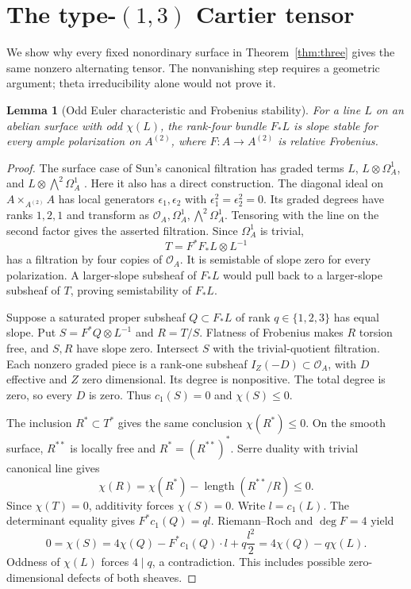\documentclass[11pt]{article}
\newtheorem{lemma}[theorem]{Lemma}
\theoremstyle{remark}\newtheorem{remark}[theorem]{Remark}
\newcommand{\OO}{\mathcal O}
\begin{document}
\section{The type-\texorpdfstring{$(1,3)$}{(1,3)} Cartier tensor}\label{sec:cartier}

We show why every fixed nonordinary surface in Theorem~\ref{thm:three} gives the same nonzero alternating tensor. The nonvanishing step requires a geometric argument; theta irreducibility alone would not prove it.

\begin{lemma}[Odd Euler characteristic and Frobenius stability]\label{lem:stable}
For a line $L$ on an abelian surface with odd $\chi(L)$, the rank-four bundle $F_*L$ is slope stable for every ample polarization on $A^{(2)}$, where $F:A\to A^{(2)}$ is relative Frobenius.
\end{lemma}
\begin{proof}
The surface case of Sun's canonical filtration has graded terms $L$, $L\otimes\Omega_A^1$, and $L\otimes\bigwedge^2\Omega_A^1$ \citep[Definition~3.1, Lemmas~3.2--3.5 and Theorem~3.6, pp.~5--9]{Sun}. Here it also has a direct construction. The diagonal ideal on $A\times_{A^{(2)}}A$ has local generators $\epsilon_1,\epsilon_2$ with $\epsilon_1^2=\epsilon_2^2=0$. Its graded degrees have ranks $1,2,1$ and transform as $\OO_A,\Omega_A^1,\bigwedge^2\Omega_A^1$. Tensoring with the line on the second factor gives the asserted filtration. Since $\Omega_A^1$ is trivial,
\[
                         T=F^*F_*L\otimes L^{-1}
\]
has a filtration by four copies of $\OO_A$. It is semistable of slope zero for every polarization. A larger-slope subsheaf of $F_*L$ would pull back to a larger-slope subsheaf of $T$, proving semistability of $F_*L$.

Suppose a saturated proper subsheaf $Q\subset F_*L$ of rank $q\in\{1,2,3\}$ has equal slope. Put $S=F^*Q\otimes L^{-1}$ and $R=T/S$. Flatness of Frobenius makes $R$ torsion free, and $S,R$ have slope zero. Intersect $S$ with the trivial-quotient filtration. Each nonzero graded piece is a rank-one subsheaf $I_Z(-D)\subset\OO_A$, with $D$ effective and $Z$ zero dimensional. Its degree is nonpositive. The total degree is zero, so every $D$ is zero. Thus $c_1(S)=0$ and $\chi(S)\le0$.

The inclusion $R^*\subset T^*$ gives the same conclusion $\chi(R^*)\le0$. On the smooth surface, $R^{**}$ is locally free and $R^*=(R^{**})^*$. Serre duality with trivial canonical line gives
\[
 \chi(R)=\chi(R^*)-\operatorname{length}(R^{**}/R)\le0.
\]
Since $\chi(T)=0$, additivity forces $\chi(S)=0$. Write $l=c_1(L)$. The determinant equality gives $F^*c_1(Q)=ql$. Riemann--Roch and $\deg F=4$ yield
\[
 0=\chi(S)=4\chi(Q)-F^*c_1(Q)\cdot l+q\frac{l^2}{2}
          =4\chi(Q)-q\chi(L).
\]
Oddness of $\chi(L)$ forces $4\mid q$, a contradiction. This includes possible zero-dimensional defects of both sheaves.
\end{proof}
\end{document}
